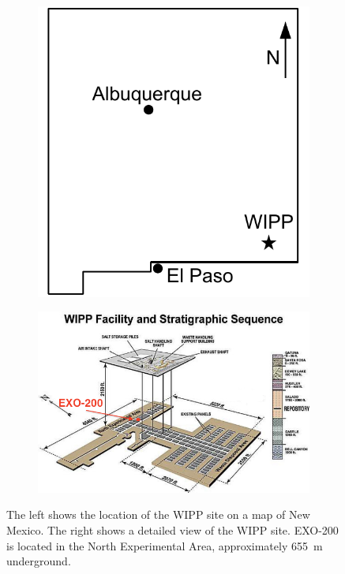 \documentclass[herrin-thesis.tex]{subfiles}
\begin{document}
\begin{figure}[htb]
\centering
\begin{subfigure}[c]{0.30\linewidth}
\includegraphics[width=\textwidth]{./figures/detector_wipp_map.pdf}
\end{subfigure}\hspace{0.05\linewidth}\hfill%
\begin{subfigure}[c]{0.60\linewidth}
\includegraphics[width=\textwidth]{./photos/wipp_site_annotated.png}
\end{subfigure}
\caption[The WIPP Site]{The left shows the location of the WIPP site on a map of New Mexico. The right shows a detailed view of the WIPP site. EXO-200 is located in the North Experimental Area, approximately \SI{655}{\m} underground.}
\label{fig:detector_wipp}
\end{figure}
\end{document}
